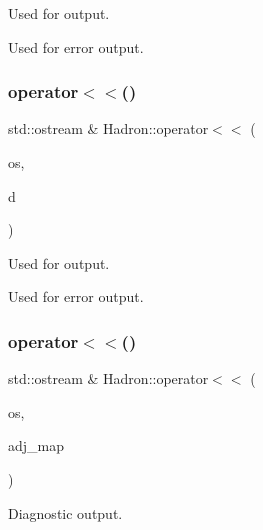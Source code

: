 Used for output. 

Used for error output. \mbox{\label{namespaceHadron_a4347887ac461374a85fd726b7dece87c}} 
\subsubsection{\texorpdfstring{operator$<$$<$()}{operator<<()}\hspace{0.1cm}{\footnotesize\ttfamily [34/48]}}
{\footnotesize\ttfamily std\+::ostream \& Hadron\+::operator$<$$<$ (\begin{DoxyParamCaption}\item[{std\+::ostream \&}]{os,  }\item[{const \mbox{\hyperlink{structHadron_1_1KeyHadronSUNNPartIrrepOp__t}{Key\+Hadron\+S\+U\+N\+N\+Part\+Irrep\+Op\+\_\+t}} \&}]{d }\end{DoxyParamCaption})}



Used for output. 

Used for error output. \mbox{\label{namespaceHadron_aefc74b3ac5cc28e73ed7a9e24b032449}} 
\subsubsection{\texorpdfstring{operator$<$$<$()}{operator<<()}\hspace{0.1cm}{\footnotesize\ttfamily [35/48]}}
{\footnotesize\ttfamily std\+::ostream \& Hadron\+::operator$<$$<$ (\begin{DoxyParamCaption}\item[{std\+::ostream \&}]{os,  }\item[{const \mbox{\hyperlink{namespaceHadron_ad6387ffed6a1bf53021dce29b71d3a04}{Hadron\+Graph\+Adj\+Map\+\_\+t}} \&}]{adj\+\_\+map }\end{DoxyParamCaption})}



Diagnostic output. 

\mbox{\label{namespaceHadron_ac4fad3eded4cdc1e5e3a20c089ff92c7}} 
